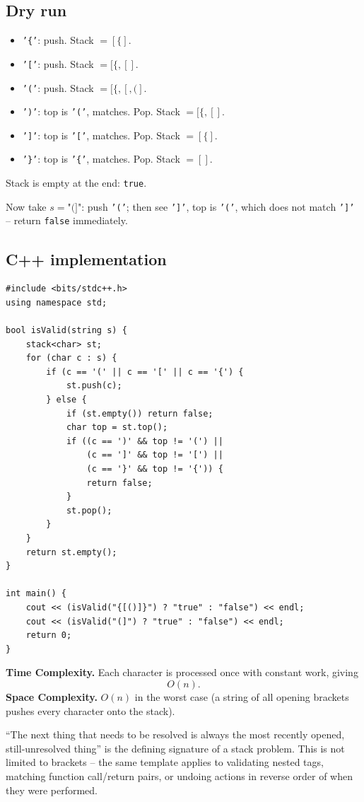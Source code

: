 \subsection*{Dry run}


\begin{itemize}
  \item \texttt{'\{'}: push. Stack $=[\{]$.
  \item \texttt{'['}: push. Stack $=[\{,[]$.
  \item \texttt{'('}: push. Stack $=[\{,[,(]$.
  \item \texttt{')'}: top is \texttt{'('}, matches. Pop. Stack
        $=[\{,[]$.
  \item \texttt{']'}: top is \texttt{'['}, matches. Pop. Stack $=[\{]$.
  \item \texttt{'\}'}: top is \texttt{'\{'}, matches. Pop. Stack $=[]$.
\end{itemize}

Stack is empty at the end: \texttt{true}.

Now take $s = \texttt{"(]"}$: push \texttt{'('}; then see \texttt{']'},
top is \texttt{'('}, which does not match \texttt{']'} -- return
\texttt{false} immediately.

\subsection*{C++ implementation}

\begin{lstlisting}
#include <bits/stdc++.h>
using namespace std;

bool isValid(string s) {
    stack<char> st;
    for (char c : s) {
        if (c == '(' || c == '[' || c == '{') {
            st.push(c);
        } else {
            if (st.empty()) return false;
            char top = st.top();
            if ((c == ')' && top != '(') ||
                (c == ']' && top != '[') ||
                (c == '}' && top != '{')) {
                return false;
            }
            st.pop();
        }
    }
    return st.empty();
}

int main() {
    cout << (isValid("{[()]}") ? "true" : "false") << endl;
    cout << (isValid("(]") ? "true" : "false") << endl;
    return 0;
}
\end{lstlisting}

\begin{complexitybox}
\textbf{Time Complexity.} Each character is processed once with constant
work, giving
\[
  O(n).
\]
\textbf{Space Complexity.} $O(n)$ in the worst case (a string of all
opening brackets pushes every character onto the stack).
\end{complexitybox}

\begin{takeawaybox}
``The next thing that needs to be resolved is always the most recently
opened, still-unresolved thing'' is the defining signature of a stack
problem. This is not limited to brackets -- the same template applies to
validating nested tags, matching function call/return pairs, or undoing
actions in reverse order of when they were performed.
\end{takeawaybox}
